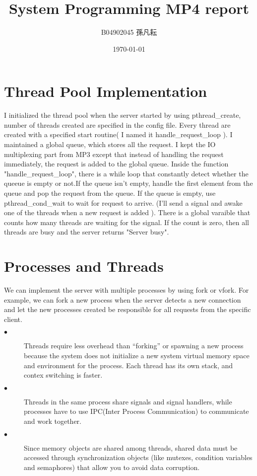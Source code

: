 \documentclass[12pt]{article}
\title{System Programming MP4 report}
\author{B04902045 孫凡耘}
\date{\today}
\begin{document}
\maketitle


\section{Thread Pool Implementation}
        \setlength{\parindent}{24pt}
I initialized the thread pool when the server started by using pthread\_create, number of threads created are specified in the config file.  Every thread are created with a specified start routine( I named it handle\_request\_loop ).  I maintained a global queue, which stores all the request.  I kept the IO multiplexing part from MP3 except that instead of handling the request immediately, the request is added to the global queue.  Inside the function "handle\_request\_loop", there is a while loop that constantly detect whether the queeue is empty or not.If the queue isn't empty, handle the first element from the queue and pop the request from the queue. If the queue is empty, use pthread\_cond\_wait to wait for request to arrive. (I'll send a signal and awake one of the threads when a new request is added ). There is a global varaible that counts how many threads are waiting for the signal. If the count is zero, then all threads are busy and the server returns "Server busy". \par

\section{Processes and Threads}
        \setlength{\parindent}{24pt}
We can implement the server with multiple processes by using fork or vfork. For example, we can fork a new process when the server detects a new connection and let the new processes created be responsible for all requests from the specific client.
\begin{description}
  \item[$\bullet$ ] Threads require less overhead than “forking” or spawning a new process because the system does not initialize a new system virtual memory space and environment for the process. Each thread has its own stack, and contex switching is faster.
  \item[$\bullet$ ] Threads in the same process share signals and signal handlers, while processes have to use IPC(Inter Process Communication) to communicate and work together.
  \item[$\bullet$ ] Since memory objects are shared among threads, shared data must be accessed through synchronization objects (like mutexes, condition variables and semaphores) that allow you to avoid data corruption.
\end{description}
\end{document}
